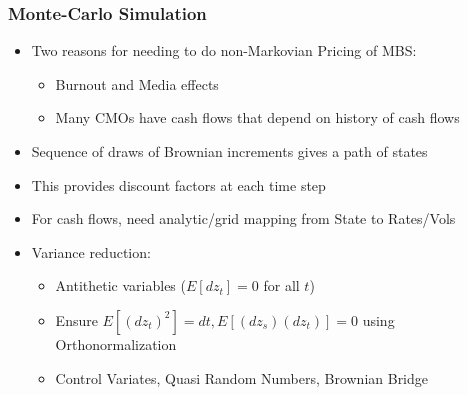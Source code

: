 \documentclass{beamer}
\begin{document}
\begin{frame}
\frametitle{Monte-Carlo Simulation}
\begin{itemize}
\item Two reasons for needing to do non-Markovian Pricing of MBS:
\begin{itemize}
\item Burnout and Media effects
\item Many CMOs have cash flows that depend on history of cash flows
\end{itemize}
\item Sequence of draws of Brownian increments gives a path of states 
\item This provides discount factors at each time step
\item For cash flows, need analytic/grid mapping from State to Rates/Vols
\item Variance reduction:
\begin{itemize}
\item Antithetic variables ($E[dz_t] = 0$ for all $t$)
\item Ensure $E[(dz_t)^2] = dt, E[(dz_s)(dz_t)] = 0$ using Orthonormalization
\item Control Variates, Quasi Random Numbers, Brownian Bridge
\end{itemize}
\end{itemize}
\end{frame}
\end{document}
